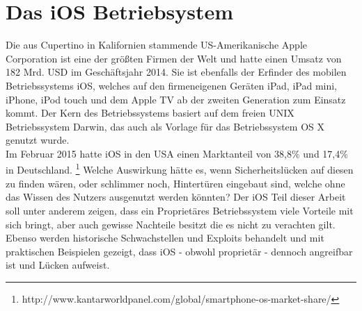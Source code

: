 \section{Das iOS Betriebsystem}
	Die aus Cupertino in Kalifornien stammende US-Amerikanische Apple Corporation
	ist eine der größten Firmen der Welt und hatte einen Umsatz von 182 Mrd.
	USD im Geschäftsjahr 2014. Sie ist ebenfalls der Erfinder des mobilen
	Betriebssystems iOS, welches auf den firmeneigenen Geräten iPad, iPad mini,
	iPhone, iPod touch und dem Apple TV ab der zweiten Generation zum Einsatz kommt.
	Der Kern des Betriebssystems basiert auf dem freien UNIX Betriebssystem Darwin,
	das auch als Vorlage für das Betriebssystem OS X genutzt wurde.\\
	Im Februar 2015 hatte iOS in den USA einen Marktanteil von 38,8\% und 17,4\%
	in Deutschland.
	\footnote{http://www.kantarworldpanel.com/global/smartphone-os-market-share/}
	Welche Auswirkung hätte es, wenn Sicherheitslücken auf diesen zu finden wären,
	oder schlimmer noch, Hintertüren eingebaut sind, welche ohne das Wissen des
	Nutzers ausgenutzt werden könnten? Der iOS Teil dieser Arbeit soll unter
	anderem zeigen, dass ein Proprietäres Betriebssystem viele Vorteile mit sich
	bringt, aber auch gewisse Nachteile besitzt die es nicht zu verachten gilt.
	Ebenso werden historische Schwachstellen und Exploits behandelt und mit 
	praktischen Beispielen gezeigt, dass iOS - obwohl proprietär - dennoch
	angreifbar ist und Lücken aufweist.
